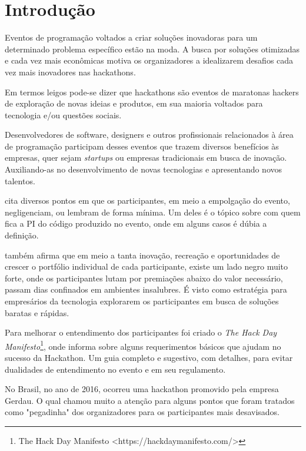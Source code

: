 \chapter{Introdução}
\label{chp:introdução}

Eventos de programação voltados a criar soluções inovadoras para um determinado problema específico estão na moda. A busca por soluções otimizadas e cada vez mais econômicas motiva os  organizadores a idealizarem desafios cada vez mais inovadores nas hackathons.


Em termos leigos pode-se dizer que hackathons são eventos de maratonas hackers de exploração de novas ideias e produtos, em sua maioria voltados para tecnologia e/ou questões sociais. \citep{briscoe2014digital}

Desenvolvedores de software, designers e outros profissionais relacionados à área de programação participam desses eventos que trazem diversos benefícios às empresas, quer sejam \textit{startups} ou empresas tradicionais em busca de inovação. Auxiliando-as no desenvolvimento de novas tecnologias e apresentando novos talentos.

\citet{zukin2017hackathons} cita diversos pontos em que os participantes, em meio a empolgação do evento, negligenciam, ou lembram de forma mínima. Um deles é o tópico sobre com quem fica a PI do código produzido no evento, onde em alguns casos é dúbia a definição. \citep{steele_2013}

\citet{zukin2017hackathons} também afirma que em meio a tanta inovação, recreação e oportunidades de crescer o portfólio individual de cada participante, existe um lado negro muito forte, onde os participantes lutam por premiações abaixo do valor necessário, passam dias confinados em ambientes insalubres. É visto como estratégia para empresários da tecnologia explorarem os participantes em busca de soluções baratas e rápidas.


Para melhorar o entendimento dos participantes foi criado o \textit{The Hack Day Manifesto}\footnote{The Hack Day Manifesto <https://hackdaymanifesto.com/>}, onde informa sobre alguns requerimentos básicos que ajudam no sucesso da Hackathon. Um guia completo e sugestivo, com detalhes, para evitar dualidades de entendimento no evento e em seu regulamento.

No Brasil, no ano de 2016, ocorreu uma hackathon promovido pela empresa Gerdau. O qual chamou muito a atenção para alguns pontos que foram tratados como "pegadinha" dos organizadores para os participantes mais desavisados. 

